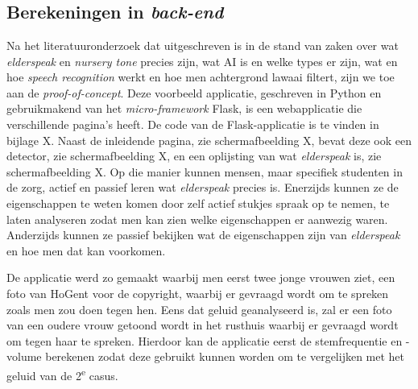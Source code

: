 
\chapter{}
\label{ch:methodologie}


\section{Berekeningen in \textit{back-end}}
Na het literatuuronderzoek dat uitgeschreven is in de stand van zaken over wat \textit{elderspeak} en \textit{nursery tone} precies zijn, wat AI is en welke types er zijn, wat en hoe \textit{speech recognition} werkt en hoe men achtergrond lawaai filtert, zijn we toe aan de \textit{proof-of-concept}. Deze voorbeeld applicatie, geschreven in Python en gebruikmakend van het \textit{micro-framework} Flask, is een webapplicatie die verschillende pagina’s heeft. De code van de Flask-applicatie is te vinden in bijlage X. Naast de inleidende pagina, zie schermafbeelding X, bevat deze ook een detector, zie schermafbeelding X, en een oplijsting van wat \textit{elderspeak} is, zie schermafbeelding X. Op die manier kunnen mensen, maar specifiek studenten in de zorg, actief en passief leren wat \textit{elderspeak} precies is. Enerzijds kunnen ze de eigenschappen te weten komen door zelf actief stukjes spraak op te nemen, te laten analyseren zodat men kan zien welke eigenschappen er aanwezig waren. Anderzijds kunnen ze passief bekijken wat de eigenschappen zijn van \textit{elderspeak} en hoe men dat kan voorkomen.

De applicatie werd zo gemaakt waarbij men eerst twee jonge vrouwen ziet, een foto van HoGent voor de copyright, waarbij er gevraagd wordt om te spreken zoals men zou doen tegen hen. Eens dat geluid geanalyseerd is, zal er een foto van een oudere vrouw getoond wordt in het rusthuis waarbij er gevraagd wordt om tegen haar te spreken. Hierdoor kan de applicatie eerst de stemfrequentie en -volume berekenen zodat deze gebruikt kunnen worden om te vergelijken met het geluid van de 2\textsuperscript{e} casus.

